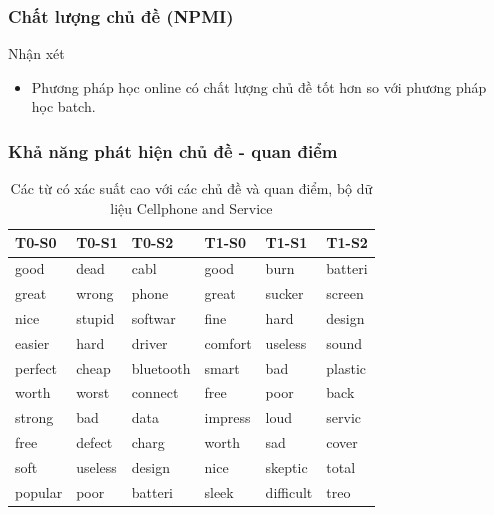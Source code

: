 \documentclass{beamer}
\begin{document}
\begin{frame}
\frametitle{Chất lượng chủ đề (NPMI)}
\begin{block}{Nhận xét}
\begin{itemize}
\item Phương pháp học online có chất lượng chủ đề tốt hơn so với phương pháp học batch.
\end{itemize}
\end{block}
\end{frame}

\begin{frame}[shrink=30]
\frametitle{Khả năng phát hiện chủ đề - quan điểm}
\begin{table}[htp!]
\begin{center}
\caption{Các từ có xác suất cao với các chủ đề và quan điểm, bộ dữ liệu Cellphone and Service}
\label{tab:top_word}
\begin{tabular}{llllll}
\toprule
   T0-S0 &    T0-S1 &      T0-S2 &    T1-S0 &      T1-S1 &    T1-S2 \\
\midrule
    good &     dead &       cabl &     good &       burn &  batteri \\
   great &    wrong &      phone &    great &     sucker &   screen \\
    nice &   stupid &    softwar &     fine &       hard &   design \\
  easier &     hard &     driver &  comfort &    useless &    sound \\
 perfect &    cheap &  bluetooth &    smart &        bad &  plastic \\
   worth &    worst &    connect &     free &       poor &     back \\
  strong &      bad &       data &  impress &       loud &   servic \\
    free &   defect &      charg &    worth &        sad &    cover \\
    soft &  useless &     design &     nice &    skeptic &    total \\
 popular &     poor &    batteri &    sleek &  difficult &     treo \\
\bottomrule
\end{tabular}


\end{center}
\end{table}
\end{frame}
\end{document}

